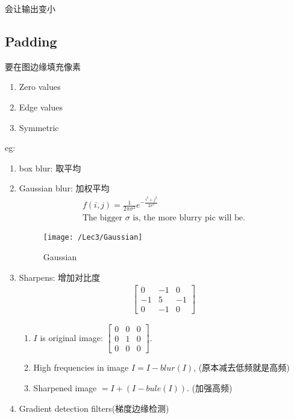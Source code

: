 会让输出变小

\subsection{Padding}
要在图边缘填充像素
\begin{enumerate}
    \item Zero values
    \item Edge values
    \item Symmetric 
\end{enumerate}

eg:
\begin{enumerate}
    \item box blur: 取平均
    \item Gaussian blur: 加权平均
    \begin{align*}
        f(i,j)=\frac{1}{2\pi \sigma^2}e^{-\frac{i^2+j^2}{2\sigma^2}}\\
        \text{The bigger } \sigma \text{ is, the more blurry pic will be.}
    \end{align*}
    \begin{figure}[H]
        \centering
        \texttt{[image: /Lec3/Gaussian]}
        \caption{Gaussian}
    \end{figure}
    \item Sharpens: 增加对比度
    \begin{align*}
        \begin{bmatrix}
            0&-1&0\\-1&5&-1\\0&-1&0
        \end{bmatrix}
    \end{align*}
    \begin{enumerate}
        \item $I$ is original image: $\begin{bmatrix}
            0&0&0\\0&1&0\\0&0&0
        \end{bmatrix}$. 
        \item High frequencies in image $I=I-blur(I)$, (原本减去低频就是高频)
        \item Sharpened image $=I+(I-bule(I))$. (加强高频)
    \end{enumerate}
    \item Gradient detection filters(梯度边缘检测)
\end{enumerate}
